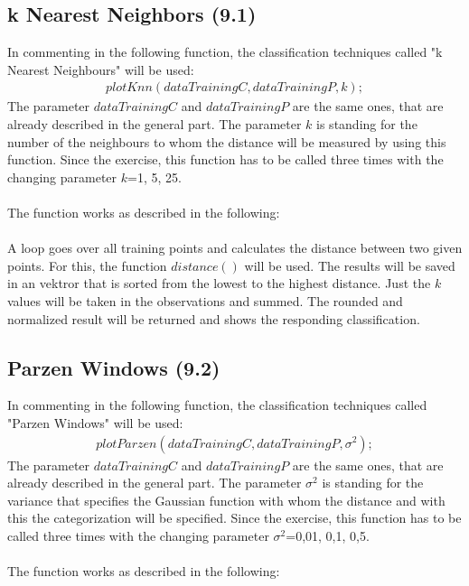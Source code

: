 \documentclass[a4paper,headings=small]{scrartcl}
\begin{document}
\subsection{k Nearest Neighbors (9.1)}
In commenting in the following function, the classification techniques called "k Nearest Neighbours" will be used:
\begin{align}
plotKnn(dataTrainingC, dataTrainingP, k);
\end{align}
The parameter $dataTrainingC$ and $dataTrainingP$ are the same ones, that are already described in the general part. The parameter $k$ is standing for the number of the neighbours to whom the distance will be measured by using this function.
Since the exercise, this function has to be called three times with the changing parameter $k$=1, 5, 25.\\
\\
The function works as described in the following:\\
\\
A loop goes over all training points and calculates the distance between two given points. For this, the function $distance()$ will be used. The results will be saved in an vektror that is sorted from the lowest to the highest distance. Just the $k$ values will be taken in the observations and summed. The rounded and normalized result will be returned and shows the responding classification.
\subsection{Parzen Windows (9.2)}
In commenting in the following function, the classification techniques called "Parzen Windows" will be used:\\
\begin{align}
plotParzen(dataTrainingC, dataTrainingP, \sigma^2);
\end{align}
The parameter $dataTrainingC$ and $dataTrainingP$ are the same ones, that are already described in the general part. The parameter $\sigma^2$ is standing for the variance that specifies the Gaussian function with whom the distance and with this the categorization will be specified.
Since the exercise, this function has to be called three times with the changing parameter $\sigma^2$=0,01, 0,1, 0,5.\\
\\
The function works as described in the following:\\
\\
\end{document}
